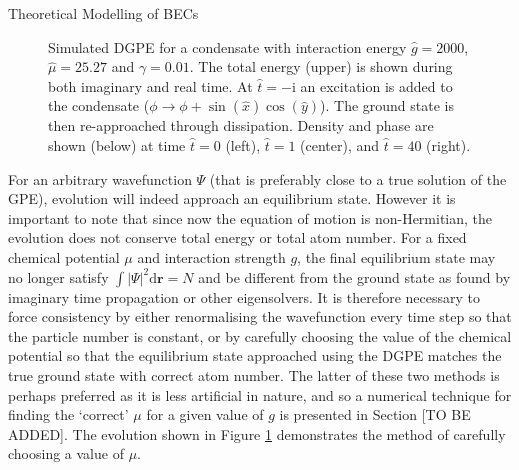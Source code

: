 \begin{chapter}{\label{cha:theoretical_model}Theoretical Modelling of BECs}
\begin{figure}[!ht]
\hspace{-0.05\linewidth}
	\caption{Simulated DGPE for a condensate with interaction energy $\hat{g}=2000$, $\hat{\mu}=25.27$ and $\gamma=0.01$. The total energy (upper) is shown during both imaginary and real time. At $\hat{t} = -\mathrm{i}$ an excitation is added to the condensate ($\phi\rightarrow \phi + \sin(\hat{x})\cos(\hat{y})$). The ground state is then re-approached through dissipation. Density and phase are shown (below) at time $\hat{t}=0$ (left), $\hat{t}=1$ (center), and $\hat{t}=40$ (right).}\label{fig_excitationdecay}
\end{figure}

	For an arbitrary wavefunction $\Psi$ (that is preferably close to a true solution of the GPE), evolution will indeed approach an equilibrium state. However it is important to note that since now the equation of motion is non-Hermitian, the evolution does not conserve total energy or total atom number. For a fixed chemical potential $\mu$ and interaction strength $g$, the final equilibrium state may no longer satisfy $\int |\Psi|^2 \mathrm{d}\mathbf{r} = N$ and be different from the ground state as found by imaginary time propagation or other eigensolvers. It is therefore necessary to force consistency by either renormalising the wavefunction every time step so that the particle number is constant, or by carefully choosing the value of the chemical potential so that the equilibrium state approached using the DGPE matches the true ground state with correct atom number. The latter of these two methods is perhaps preferred as it is less artificial in nature, and so a numerical technique for finding the `correct' $\mu$ for a given value of $g$ is presented in Section [TO BE ADDED]. The evolution shown in Figure \ref{fig_excitationdecay} demonstrates the method of carefully choosing a value of $\mu$.


\end{chapter}
